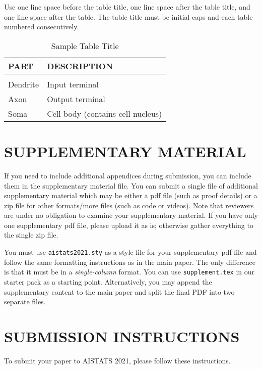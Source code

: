 \documentclass[twoside]{article}
\begin{document}
Use one line space before the table title, one line space after the table title,
and one line space after the table. The table title must be
initial caps and each table numbered consecutively.

\begin{table}[h]
\caption{Sample Table Title} \label{sample-table}
\begin{center}
\begin{tabular}{ll}
\textbf{PART}  &\textbf{DESCRIPTION} \\
\hline \\
Dendrite         &Input terminal \\
Axon             &Output terminal \\
Soma             &Cell body (contains cell nucleus) \\
\end{tabular}
\end{center}
\end{table}

\section{SUPPLEMENTARY MATERIAL}

If you need to include additional appendices during submission, you can include them in the supplementary material file.
You can submit a single file of additional supplementary material which may be either a pdf file (such as proof details) or a zip file for other formats/more files (such as code or videos). 
Note that reviewers are under no obligation to examine your supplementary material. 
If you have only one supplementary pdf file, please upload it as is; otherwise gather everything to the single zip file.

You must use \texttt{aistats2021.sty} as a style file for your supplementary pdf file and follow the same formatting instructions as in the main paper. 
The only difference is that it must be in a \emph{single-column} format.
You can use \texttt{supplement.tex} in our starter pack as a starting point.
Alternatively, you may append the supplementary content to the main paper and split the final PDF into two separate files.

\section{SUBMISSION INSTRUCTIONS}

To submit your paper to AISTATS 2021, please follow these instructions.
\end{document}
